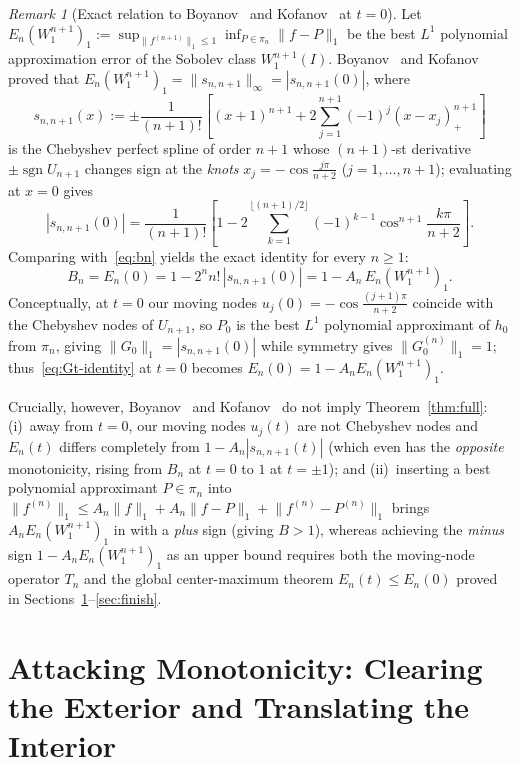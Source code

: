 \documentclass[11pt,a4paper]{article}
\newcommand{\sgn}{\operatorname{sgn}}
\newcommand{\Lone}[1]{\lVert #1\rVert_1}
\theoremstyle{remark}
\newtheorem{remark}[proposition]{Remark}
\numberwithin{equation}{section}
\begin{document}
\begin{remark}[Exact relation to Boyanov~\cite{Boyanov1975} and Kofanov~\cite{Kofanov1984} at $t = 0$]
    \label{rem:burenkov-kofanov}
    Let $E_n(W_1^{n+1})_1 := \sup_{\Lone{f^{(n+1)}} \le 1} \inf_{P \in \pi_n} \Lone{f - P}$ be the best $L^1$ polynomial approximation error of the Sobolev class $W_1^{n+1}(I)$. Boyanov~\cite[\S3]{Boyanov1975} and Kofanov~\cite[Theorems~3 and~5]{Kofanov1984} proved that $E_n(W_1^{n+1})_1 = \lVert s_{n,n+1}\rVert_\infty = |s_{n,n+1}(0)|$, where
    \[
        s_{n,n+1}(x) := \pm\frac{1}{(n+1)!}\left[(x + 1)^{n+1} + 2\sum_{j=1}^{n+1}(-1)^j(x - x_j)_+^{n+1}\right]
    \]
    is the Chebyshev perfect spline of order $n+1$ whose $(n+1)$-st derivative $\pm\sgn U_{n+1}$ changes sign at the \emph{knots} $x_j = -\cos\frac{j\pi}{n+2}$ ($j = 1, \dots, n+1$); evaluating at $x = 0$ gives
    \[
        |s_{n,n+1}(0)|
        = \frac{1}{(n+1)!}\left[1 - 2\sum_{k=1}^{\lfloor(n+1)/2\rfloor}(-1)^{k-1}\cos^{n+1}\frac{k\pi}{n+2}\right].
    \]
    Comparing with~\eqref{eq:bn} yields the exact identity for every $n \ge 1$:
    \[
        B_n = E_n(0) = 1 - 2^n n!\,|s_{n,n+1}(0)| = 1 - A_n\,E_n(W_1^{n+1})_1.
    \]
    Conceptually, at $t = 0$ our moving nodes $u_j(0) = -\cos\frac{(j+1)\pi}{n+2}$ coincide with the Chebyshev nodes of $U_{n+1}$, so $P_0$ is the best $L^1$ polynomial approximant of $h_0$ from $\pi_n$, giving $\Lone{G_0} = |s_{n,n+1}(0)|$ while symmetry gives $\Lone{G_0^{(n)}} = 1$; thus~\eqref{eq:Gt-identity} at $t = 0$ becomes $E_n(0) = 1 - A_n E_n(W_1^{n+1})_1$.

    Crucially, however, Boyanov~\cite{Boyanov1975} and Kofanov~\cite{Kofanov1984} do not imply Theorem~\ref{thm:full}: (i)~away from $t = 0$, our moving nodes $u_j(t)$ are not Chebyshev nodes and $E_n(t)$ differs completely from $1 - A_n |s_{n,n+1}(t)|$ (which even has the \emph{opposite} monotonicity, rising from $B_n$ at $t=0$ to $1$ at $t = \pm 1$); and (ii)~inserting a best polynomial approximant $P \in \pi_n$ into $\Lone{f^{(n)}} \le A_n\Lone{f} + A_n\Lone{f - P} + \Lone{f^{(n)} - P^{(n)}}$ brings $A_n E_n(W_1^{n+1})_1$ in with a \emph{plus} sign (giving $B > 1$), whereas achieving the \emph{minus} sign $1 - A_n E_n(W_1^{n+1})_1$ as an upper bound requires both the moving-node operator $T_n$ and the global center-maximum theorem $E_n(t) \le E_n(0)$ proved in Sections~\ref{sec:setup}--\ref{sec:finish}.
\end{remark}

\section{Attacking Monotonicity: Clearing the Exterior and Translating the Interior}
\label{sec:setup}
\end{document}
